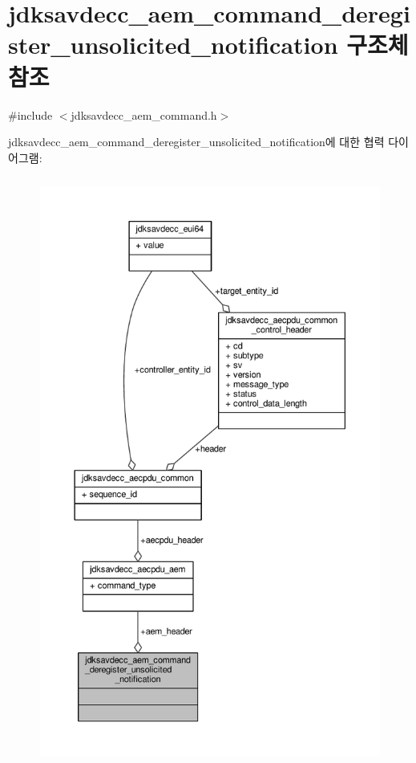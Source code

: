 \hypertarget{structjdksavdecc__aem__command__deregister__unsolicited__notification}{}\section{jdksavdecc\+\_\+aem\+\_\+command\+\_\+deregister\+\_\+unsolicited\+\_\+notification 구조체 참조}
\label{structjdksavdecc__aem__command__deregister__unsolicited__notification}


{\ttfamily \#include $<$jdksavdecc\+\_\+aem\+\_\+command.\+h$>$}



jdksavdecc\+\_\+aem\+\_\+command\+\_\+deregister\+\_\+unsolicited\+\_\+notification에 대한 협력 다이어그램\+:
\nopagebreak
\begin{figure}[H]
\begin{center}
\leavevmode
\includegraphics[height=550pt]{structjdksavdecc__aem__command__deregister__unsolicited__notification__coll__graph}
\end{center}
\end{figure}
